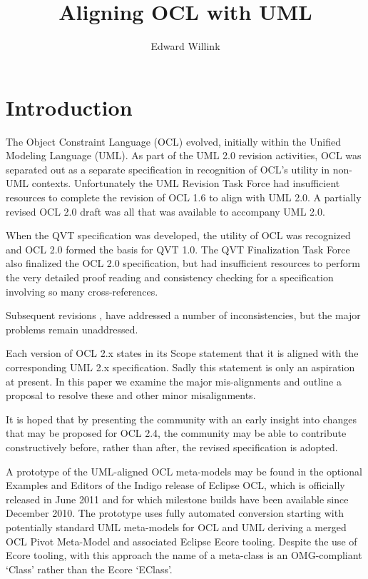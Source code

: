 \documentclass{eceasst}
\title{%
Aligning OCL with UML}
\author{%
Edward Willink\autref{1}}
\institute{%
\autlabel{1} \email{ed \_at\_ willink.me.uk}, \url{http://www.eclipse.org/modeling}\\
Eclipse Modeling Project}
\begin{document}
\maketitle
\section{Introduction}

The Object Constraint Language (OCL) evolved, initially within the Unified Modeling Language (UML). As part of the UML 2.0\cite{UML-2.0} revision activities, OCL was separated out as a separate specification in recognition of OCL's utility in non-UML contexts. Unfortunately the UML Revision Task Force had insufficient resources to complete the revision of OCL 1.6\cite{OCL-1.6} to align with UML 2.0. A partially revised OCL 2.0 draft\cite{OCL-2.0-draft} was all that was available to accompany UML 2.0.

When the QVT specification was developed, the utility of OCL was recognized and OCL 2.0\cite{OCL-2.0} formed the basis for QVT 1.0\cite{QVT-1.0}. The QVT Finalization Task Force also finalized the OCL 2.0 specification, but  had insufficient resources to perform the very detailed proof reading and consistency checking for a specification involving so many cross-references.

Subsequent revisions \cite{OCL-2.2},\cite{OCL-2.3} have addressed a number of  inconsistencies, but the major problems remain unaddressed.

Each version of OCL 2.x states in its Scope statement that it is aligned with the corresponding UML 2.x specification. Sadly this statement is only an aspiration at present. In this paper we examine the major mis-alignments and outline a proposal to resolve these and other minor misalignments.

It is hoped that by presenting the community with an early insight into changes that may be proposed for OCL 2.4, the community may be able to contribute constructively before, rather than after, the revised specification is adopted.

A prototype of the UML-aligned OCL meta-models may be found in the optional Examples and Editors of the Indigo release of Eclipse OCL, which is officially released in June 2011 and for which milestone builds have been available since December 2010. The prototype uses fully automated conversion starting with potentially standard UML meta-models for OCL and UML deriving a merged OCL Pivot Meta-Model and associated Eclipse Ecore tooling. Despite the use of Ecore tooling, with this approach the name of a meta-class is an OMG-compliant `Class' rather than the Ecore `EClass'. 
\end{document}
